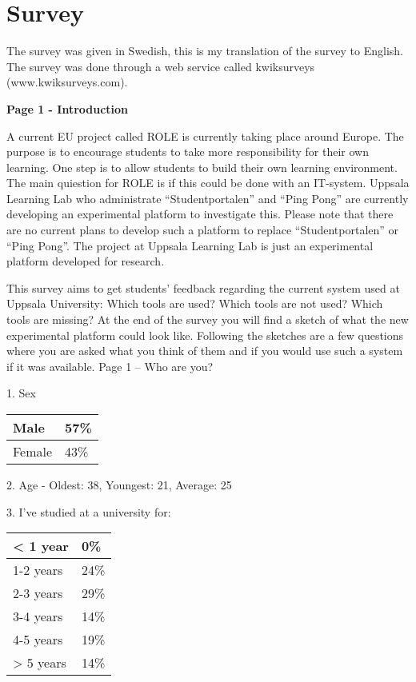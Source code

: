 \appendix
\section {Survey}
The survey was given in Swedish, this is my translation of the survey to English. The survey was done through a web service called kwiksurveys (www.kwiksurveys.com). 

\textbf{Page 1 - Introduction}

A current EU project called ROLE is currently taking place around Europe. The purpose is to encourage students to take more responsibility for their own learning. One step is to allow students to build their own learning environment.
The main quiestion for ROLE is if this could be done with an IT-system. Uppsala Learning Lab who administrate “Studentportalen” and “Ping Pong” are currently developing an experimental platform to investigate this. Please note that there are no current plans to develop such a platform to replace “Studentportalen” or “Ping Pong”. The project at Uppsala Learning Lab is just an experimental platform developed for research.

This survey aims to get students' feedback regarding the current system used at Uppsala University: Which tools are used? Which tools are not used? Which tools are missing?
At the end of the survey you will find a sketch of what the new experimental platform could look like. Following the sketches are a few questions where you are asked what you think of them and if you would use such a system if it was available.
Page 1 – Who are you?

1. Sex

\begin{center}
    \begin{tabular}{ | l | l | }
    \hline
    Male & 57\% \\ \hline
	Female & 43\% \\ \hline
    \end{tabular}
\end{center}

2. Age - Oldest: 38, Youngest: 21, Average: 25

3. I've studied at a university for:

\begin{center}
    \begin{tabular}{ | l | l | }
    \hline
    < 1 year & 0\% \\ \hline
	1-2 years & 24\% \\ \hline
	2-3 years & 29\% \\ \hline
	3-4 years & 14\% \\ \hline
	4-5 years & 19\% \\ \hline
	> 5 years & 14\% \\ \hline
    \end{tabular}
\end{center}


